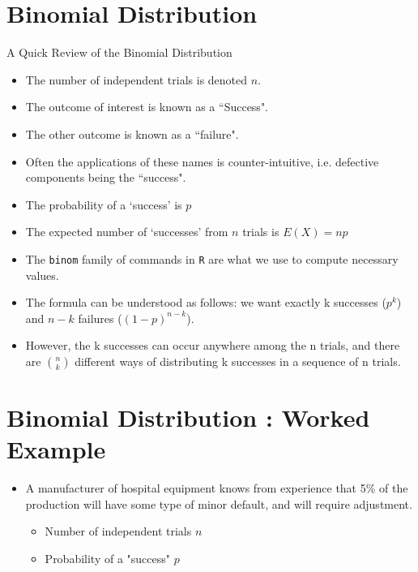 \documentclass[a4paper,12pt]{article}
\begin{document}

\section{Binomial Distribution}
A Quick Review of the Binomial Distribution
\begin{itemize}
\item The number of independent trials is denoted $n$.
\item The outcome of interest is known as a ``Success".
\item The other outcome is known as a ``failure".  
\item Often the applications of these names is counter-intuitive, i.e. defective components being the ``success".
\item The probability of a `success' is $p$ 
\item The expected number of `successes' from $n$ trials is $E(X) = np$
\item The \texttt{binom} family of commands in \texttt{R} are what we use to compute necessary values.
\end{itemize}




\begin{itemize}
	\item The formula can be understood as follows: we want exactly k successes ($p^k$) and $n - k$ failures ($(1 - p)^{n - k}$).
	\item However, the k successes can occur anywhere among the n trials, and there are ${n \choose k}$ different ways of distributing k successes in a sequence of n trials.
\end{itemize}













\section{Binomial Distribution : Worked Example}
\begin{itemize}
\item A manufacturer of hospital equipment knows from experience that 5\% of the production will have some type of minor default, and will require adjustment.

\begin{itemize}
\item Number of independent trials $n$

\item Probability of a "success" $p$

\end{itemize}
\end{itemize}
\end{document}
